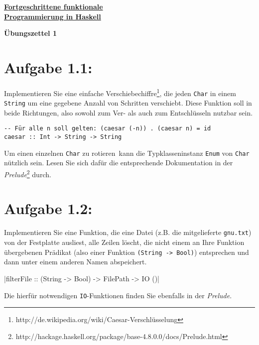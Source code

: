\documentclass[a4paper,10pt]{scrartcl}
\newcommand{\underfat}[1]{\underline{\textbf{#1}}}
\newcommand{\theuebungszettel}{1}
\begin{document}
\begin{center}
  \begin{huge}
    \underfat{Fortgeschrittene funktionale}\\
    \underfat{Programmierung in Haskell}\\
  \end{huge}
\begin{LARGE}
\textbf{Übungszettel \theuebungszettel}

\end{LARGE}
\end{center}

\section*{Aufgabe \theuebungszettel.1:}

Implementieren Sie eine einfache Verschiebechiffre\footnote{http://de.wikipedia.org/wiki/Caesar-Verschlüsselung}, die jeden \texttt{Char} in einem \texttt{String} um eine gegebene Anzahl von Schritten verschiebt. Diese Funktion soll \glqq in beide Richtungen\grqq , also sowohl zum Ver- als auch zum Entschlüsseln nutzbar sein.

\begin{verbatim}
-- Für alle n soll gelten: (caesar (-n)) . (caesar n) = id 
caesar :: Int -> String -> String
\end{verbatim}

Um einen einzelnen \texttt{Char} zu \glqq rotieren\grqq\ kann die Typklasseninstanz \texttt{Enum} von \texttt{Char} nützlich sein. Lesen Sie sich dafür die entsprechende Dokumentation in der \emph{Prelude}\footnote{http://hackage.haskell.org/package/base-4.8.0.0/docs/Prelude.html} durch.

\section*{Aufgabe \theuebungszettel.2:}

Implementieren Sie eine Funktion, die eine Datei (z.B. die mitgelieferte \texttt{gnu.txt}) von der Festplatte ausliest, alle Zeilen löscht, die nicht einem an Ihre Funktion übergebenen Prädikat (also einer Funktion \texttt{(String -> Bool)}) entsprechen und dann unter einem anderen Namen abspeichert.

|filterFile :: (String -> Bool) -> FilePath -> IO ()|

Die hierfür notwendigen \texttt{IO}-Funktionen finden Sie ebenfalls in der \emph{Prelude}.
\end{document}
